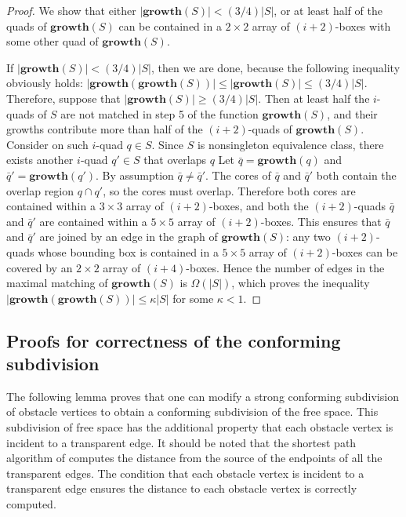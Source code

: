 \begin{proof}
We show that either $|\mathbf{growth}(S)| < (3/4)|S|$, or at least half of the quads of $\mathbf{growth}(S)$ can be contained in a $2 \times 2$ array of $(i+2)$-boxes with some other quad of $\mathbf{growth}(S)$. 

If $|\mathbf{growth}(S)| < (3/4)|S|$, then we are done, because the following inequality obviously holds: $|\mathbf{growth}(\mathbf{growth}(S))| \leq |\mathbf{growth}(S)| \leq (3/4)|S|$. Therefore, suppose that $|\mathbf{growth}(S)| \geq (3/4)|S|$. Then at least half the $i$-quads of $S$ are not matched in step 5 of the function $\mathbf{growth}(S)$, and their growths contribute more than half of the $(i+2)$-quads of $\mathbf{growth}(S)$. Consider on such $i$-quad $q\in S$. Since $S$ is nonsingleton equivalence class, there exists another $i$-quad $q'\in S$ that overlaps $q$ Let $\bar{q}=\mathbf{growth}(q)$ and $\bar{q}' = \mathbf{growth}(q')$. By assumption $\bar{q} \neq \bar{q}'$. The cores of $\bar{q}$ and $\bar{q}'$ both contain the overlap region $q\cap q'$, so the cores must overlap. Therefore both cores are contained within a $3 \times 3$ array of $(i+2)$-boxes, and both the $(i+2)$-quads $\bar{q}$ and $\bar{q}'$ are contained within a $5 \times 5$ array of $(i+2)$-boxes. This ensures that $\bar{q}$ and $\bar{q}'$ are joined by an edge in the graph of $\mathbf{growth}(S)$: any two $(i+2)$-quads whose bounding box is contained in a $5 \times 5$ array of $(i+2)$-boxes can be covered by an $2 \times 2$ array of $(i+4)$-boxes. Hence the number of edges in the maximal matching of $\mathbf{growth}(S)$ is $\Omega(|S|)$, which proves the inequality $|\mathbf{growth}(\mathbf{growth}(S))| \leq \kappa|S|$ for some $\kappa < 1$.
\end{proof}

\subsection{Proofs for correctness of the conforming subdivision}

The following lemma proves that one can modify a strong conforming subdivision of 
obstacle vertices to obtain a conforming subdivision of the free space. This 
subdivision of free space has the additional property that each obstacle vertex is 
incident to a transparent edge. It should be noted that the shortest path algorithm of 
\cite{HershbergerS99} computes the distance from the source of the endpoints of all 
the transparent edges. The condition that each obstacle vertex is incident to a 
transparent edge ensures the distance to each obstacle vertex is correctly computed.

